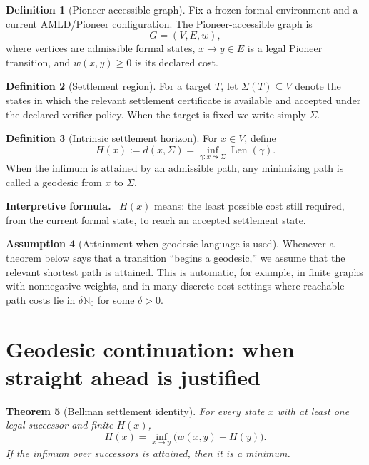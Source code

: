 \documentclass[11pt]{article}
\newtheorem{theorem}{Theorem}[section]
\theoremstyle{definition}
\newtheorem{definition}[theorem]{Definition}
\newtheorem{assumption}[theorem]{Assumption}
\theoremstyle{remark}
\newcommand{\Sett}{\Sigma}
\newenvironment{interpretiveformula}{%
  \begin{center}\begin{minipage}{0.92\textwidth}\small
  \textbf{Interpretive formula.}\ }{\end{minipage}\end{center}}
\begin{document}
\begin{definition}[Pioneer-accessible graph]
Fix a frozen formal environment and a current AMLD/Pioneer configuration. The Pioneer-accessible graph is
\[
G=(V,E,w),
\]
where vertices are admissible formal states, $x\to y\in E$ is a legal Pioneer transition, and $w(x,y)\ge 0$ is its declared cost.
\end{definition}

\begin{definition}[Settlement region]
For a target $T$, let $\Sett(T)\subseteq V$ denote the states in which the relevant settlement certificate is available and accepted under the declared verifier policy. When the target is fixed we write simply $\Sett$.
\end{definition}

\begin{definition}[Intrinsic settlement horizon]
For $x\in V$, define
\[
H(x):=d(x,\Sett)=\inf_{\gamma:x\leadsto \Sett}\operatorname{Len}(\gamma).
\]
When the infimum is attained by an admissible path, any minimizing path is called a geodesic from $x$ to $\Sett$.
\end{definition}

\begin{interpretiveformula}
$H(x)$ means: the least possible cost still required, from the current formal state, to reach an accepted settlement state.
\end{interpretiveformula}

\begin{assumption}[Attainment when geodesic language is used]
Whenever a theorem below says that a transition ``begins a geodesic,'' we assume that the relevant shortest path is attained. This is automatic, for example, in finite graphs with nonnegative weights, and in many discrete-cost settings where reachable path costs lie in $\delta\mathbb N_0$ for some $\delta>0$.
\end{assumption}

\section{Geodesic continuation: when straight ahead is justified}

\begin{theorem}[Bellman settlement identity]
For every state $x$ with at least one legal successor and finite $H(x)$,
\[
H(x)=\inf_{x\to y}\bigl(w(x,y)+H(y)\bigr).
\]
If the infimum over successors is attained, then it is a minimum.
\end{theorem}
\end{document}
